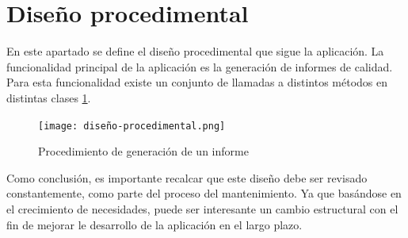 \section{Diseño procedimental}
En este apartado se define el diseño procedimental que sigue la aplicación. La funcionalidad principal de la aplicación es la generación de informes de calidad. Para esta funcionalidad existe un conjunto de llamadas a distintos métodos en distintas clases \ref{fig:diseño-procedimental}.

\begin{figure}
    \centering
    \texttt{[image: diseño-procedimental.png]}
    \caption{Procedimiento de generación de un informe}
    \label{fig:diseño-procedimental}
\end{figure}

Como conclusión, es importante recalcar que este diseño debe ser revisado constantemente, como parte del proceso del mantenimiento. Ya que basándose en el crecimiento de necesidades, puede ser interesante un cambio estructural con el fin de mejorar le desarrollo de la aplicación en el largo plazo.



